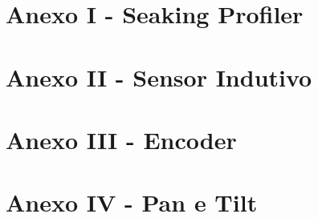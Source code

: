 \appendix
\section{Anexo I - Seaking Profiler} 
\label{seaking_profiler} 




\appendix
\section{Anexo II - Sensor Indutivo} 
\label{datasheet_indutivo} 




\appendix
\section{Anexo III - Encoder} 
\label{datasheet_encoder} 



\appendix
\section{Anexo IV - Pan e Tilt} 
\label{datasheet_pantilt} 


